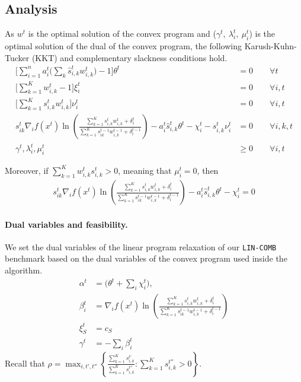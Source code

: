 \subsection{Analysis}
As $w^{t}$ is the optimal solution of the convex program and ($\gamma^t,\ \lambda_{i}^{t},\ \mu_{i}^{t}$) is the optimal solution of the dual of the convex program, the following Karush-Kuhn-Tucker (KKT) and complementary slackness conditions hold.
%
\begin{align*}
   \biggl[ \sum_{i=1}^{n} a_{i}^{t} \biggl( \sum_{k}  \hat{s}_{i,k}^{t} w_{i,k}^{t} \biggr) - 1 \biggr] \theta^{t} &= 0 \qquad \forall t \\
   \biggl[ \sum_{k=1}^{K}  w_{i,k}^{t}  - 1 \biggr] \xi_{i}^{t} &= 0 \qquad \forall i, t \\
   \biggl[ \sum_{k=1}^{K}  s_{i,k}^{t} w_{i,k}^{t} \biggr] \nu_{i}^{t} &= 0 \qquad \forall i, t \\
%
 s_{ik}^{t} \nabla_{i} f(x^{t}) \ln \left( \frac{\sum_{k=1}^{K} s_{i,k}^{t} w_{i,k}^{t} + \delta_{i}^{t}}{\sum_{k=1}^{K}  s_{ik}^{t-1}w_{i,k}^{t-1}  + \delta_{i}^{t-1}} \right) - a_{i}^{t} \hat{s}_{i,k}^{t} \theta^{t} - \chi_{i}^{t} - s_{i,k}^{t} \nu_{i}^{t} &= 0	\qquad \forall i,k,t \\
	\gamma^{t}, \lambda_{i}^{t}, \mu_{i}^{t} &\geq 0 \qquad \forall i, t
\end{align*}

Moreover, if $\sum_{k=1}^{K} w_{i,k}^{t} s_{i,k}^{t} > 0$, meaning that $\mu_{i}^{t} = 0$, then
\begin{align}	\label{eq:KKT}
 s_{ik}^{t} \nabla_{i} f(x^{t}) \ln \left( \frac{\sum_{k=1}^{K} s_{i,k}^{t} w_{i,k}^{t} + \delta_{i}^{t}}{\sum_{k=1}^{K}  s_{ik}^{t-1}w_{i,k}^{t-1}  + \delta_{i}^{t-1}} \right)
    	- a_{i}^{t} \hat{s}_{i,k}^{t} \theta^{t} - \chi_{i}^{t} = 0
\end{align}


\paragraph{Dual variables and feasibility.} We set the dual variables of the linear program relaxation of our \texttt{LIN-COMB} benchmark based on the dual variables of the convex program used inside the algorithm.
%
\begin{align*}
    \alpha^{t} &= \biggl( \theta^{t} + \sum_{i} \chi_{i}^{t} \biggr), \\
    \beta_{i}^{t} &= \nabla_{i} f(x^{t})\ln \left( \frac{\sum_{k=1}^{K} s_{i,k}^{t} w_{i,k}^{t} + \delta_{i}^{t}}{\sum_{k=1}^{K}  s_{ik}^{t-1}w_{i,k}^{t-1}  + \delta_{i}^{t-1}} \right) \\
    \xi_{S}^{t} &= c_{S}\\
    \gamma^{t} &= -\sum_{i}\beta_{i}^{t}
\end{align*}
%
Recall that $\rho = \max_{i, t',t''} \left\{\frac{\sum_{k=1}^{K} s_{i,k}^{t'}}{\sum_{k=1}^{K} s_{i,k}^{t''}} : \sum_{k=1}^{K} s_{i,k}^{t''} > 0 \right\}$.

